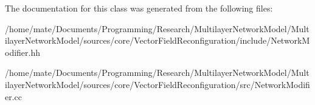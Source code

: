 The documentation for this class was generated from the following files\+:\begin{DoxyCompactItemize}
\item 
/home/mate/\+Documents/\+Programming/\+Research/\+Multilayer\+Network\+Model/\+Multilayer\+Network\+Model/sources/core/\+Vector\+Field\+Reconfiguration/include/Network\+Modifier.\+hh\item 
/home/mate/\+Documents/\+Programming/\+Research/\+Multilayer\+Network\+Model/\+Multilayer\+Network\+Model/sources/core/\+Vector\+Field\+Reconfiguration/src/Network\+Modifier.\+cc\end{DoxyCompactItemize}

